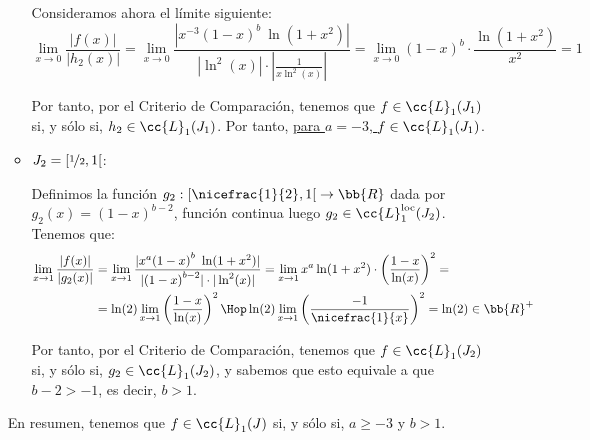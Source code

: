 \begin{ejercicio}
\begin{enumerate}
\begin{itemize}
            Consideramos ahora el límite siguiente:
            \begin{equation*}
                \lim_{x\to 0} \dfrac{|f(x)|}{|h_2(x)|}
                = \lim_{x\to 0} \dfrac{|x^{-3}{(1-x)}^b~\ln(1+x^2)|}{|\ln^2(x)|\cdot \left|\frac{1}{x\ln^2(x)}\right|}
                = \lim_{x\to 0} {(1-x)}^b\cdot \dfrac{\ln(1+x^2)}{x^2} = 1
            \end{equation*}

            Por tanto, por el Criterio de Comparación, tenemos que $f\in \cc{L}_1(J_1)$ si, y sólo si, $h_2\in \cc{L}_1(J_1)$. Por tanto, \ul{para $a=-3$, $f\in \cc{L}_1(J_1)$}.
            
            
            \item \ul{$J_2=\left[\nicefrac{1}{2}, 1\right[$}:
            
            Definimos la función $g_2:\left[\nicefrac{1}{2},1\right[\to \bb{R}$ dada por $g_2(x)={(1-x)}^{b-2}$, función continua luego $g_2\in \cc{L}_1^{\text{loc}}(J_2)$.
            Tenemos que:
            \begin{align*}
                \lim_{x\to 1} \dfrac{|f(x)|}{|g_2(x)|}
                &= \lim_{x\to 1} \dfrac{|x^a{(1-x)}^b~\ln(1+x^2)|}{|{(1-x)}^{b-2}|\cdot |\ln^2(x)|}
                = \lim_{x\to 1} x^a\ln(1+x^2) \cdot \left(\dfrac{1-x}{\ln(x)}\right)^2
                =\\&=
                \ln(2)\lim_{x\to 1} \left(\dfrac{1-x}{\ln(x)}\right)^2
                \Hop \ln(2)\lim_{x\to 1} \left(\dfrac{-1}{\nicefrac{1}{x}}\right)^2 = \ln(2)\in \bb{R}^+
            \end{align*}

            Por tanto, por el Criterio de Comparación, tenemos que $f\in \cc{L}_1(J_2)$ si, y sólo si, $g_2\in \cc{L}_1(J_2)$, y sabemos que esto equivale a que $b-2>-1$, es decir, $b>1$.
        \end{itemize}

        En resumen, tenemos que $f\in \cc{L}_1(J)$ si, y sólo si, $a\geq -3$ y $b>1$.
    \end{enumerate}
\end{ejercicio}

